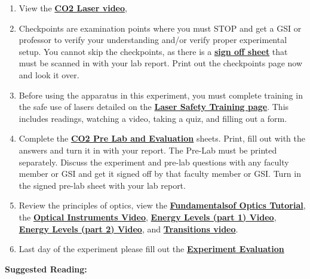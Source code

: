 \documentclass{../lab}
\begin{document}
\begin{enumerate}
    \item View the \href{http://youtu.be/-cLSnuXGC\_U}{\textbf{CO2 Laser video}},
    \item Checkpoints are examination points where you must STOP and get a GSI or professor to verify your understanding and/or verify proper experimental setup. You cannot skip the checkpoints, as there is a \href{http://experimentationlab.berkeley.edu/node/137}{\textbf{sign off sheet}} that must be scanned in with your lab report. Print out the checkpoints page now and look it over.
    \item Before using the apparatus in this experiment, you must complete training in the safe use of lasers detailed on the \href{http://experimentationlab.berkeley.edulasersafety}{\textbf{\textbf{Laser Safety Training page}}}. This includes readings, watching a video, taking a quiz, and filling out a form.
    \item Complete the \href{http://experimentationlab.berkeley.edu/CO2prelab}{\textbf{\textbf{CO2 Pre Lab and Evaluation}}} sheets. Print,  fill out with the answers and turn it in with your report. The Pre-Lab must be printed separately. Discuss the experiment and pre-lab questions with any faculty member or GSI and get it signed off by that faculty member or GSI. Turn in the signed pre-lab sheet with your lab report.
    \item Review the principles of optics, view the \href{http://experimentationlab.berkeley.edu/sites/default/files/QIE/fundamental-Optics.pdf}{\textbf{Fundamentals}}\href{http://experimentationlab.berkeley.edu/sites/default/files/QIE/fundamental-Optics.pdf}{\textbf{of Optics Tutorial}}, the \href{http://youtu.be/zUGBt5vc5FA}{\textbf{Optical Instruments Video}}, \href{http://youtu.be/wyBOVjU5bBQ}{\textbf{Energy Levels (part 1) Video}}, \href{http://youtu.be/Eypw0DmVBxk}{\textbf{Energy Levels (part 2) Video}}, and \href{http://youtu.be/xOMgdVP3AfE}{\textbf{Transitions video}}.
    \item Last day of the experiment please fill out the \href{\ExperimentEvaluation}{\textbf{Experiment Evaluation}}
\end{enumerate}

\textbf{Suggested Reading:}
\end{document}
